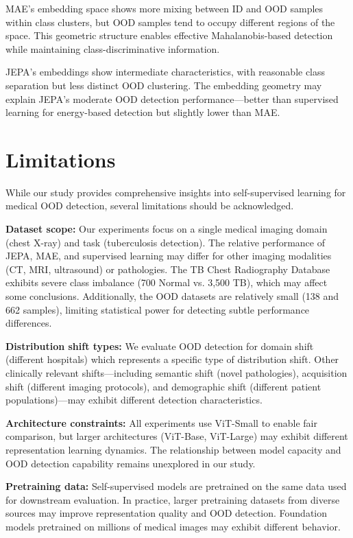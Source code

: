 \documentclass[11pt,a4paper]{article}
\begin{document}
MAE's embedding space shows more mixing between ID and OOD samples within class clusters, but OOD samples tend to occupy different regions of the space. This geometric structure enables effective Mahalanobis-based detection while maintaining class-discriminative information.

JEPA's embeddings show intermediate characteristics, with reasonable class separation but less distinct OOD clustering. The embedding geometry may explain JEPA's moderate OOD detection performance—better than supervised learning for energy-based detection but slightly lower than MAE.

\section{Limitations}

While our study provides comprehensive insights into self-supervised learning for medical OOD detection, several limitations should be acknowledged.

\textbf{Dataset scope:} Our experiments focus on a single medical imaging domain (chest X-ray) and task (tuberculosis detection). The relative performance of JEPA, MAE, and supervised learning may differ for other imaging modalities (CT, MRI, ultrasound) or pathologies. The TB Chest Radiography Database exhibits severe class imbalance (700 Normal vs. 3,500 TB), which may affect some conclusions. Additionally, the OOD datasets are relatively small (138 and 662 samples), limiting statistical power for detecting subtle performance differences.

\textbf{Distribution shift types:} We evaluate OOD detection for domain shift (different hospitals) which represents a specific type of distribution shift. Other clinically relevant shifts—including semantic shift (novel pathologies), acquisition shift (different imaging protocols), and demographic shift (different patient populations)—may exhibit different detection characteristics.

\textbf{Architecture constraints:} All experiments use ViT-Small to enable fair comparison, but larger architectures (ViT-Base, ViT-Large) may exhibit different representation learning dynamics. The relationship between model capacity and OOD detection capability remains unexplored in our study.

\textbf{Pretraining data:} Self-supervised models are pretrained on the same data used for downstream evaluation. In practice, larger pretraining datasets from diverse sources may improve representation quality and OOD detection. Foundation models pretrained on millions of medical images \citep{huang2023foundation} may exhibit different behavior.
\end{document}
